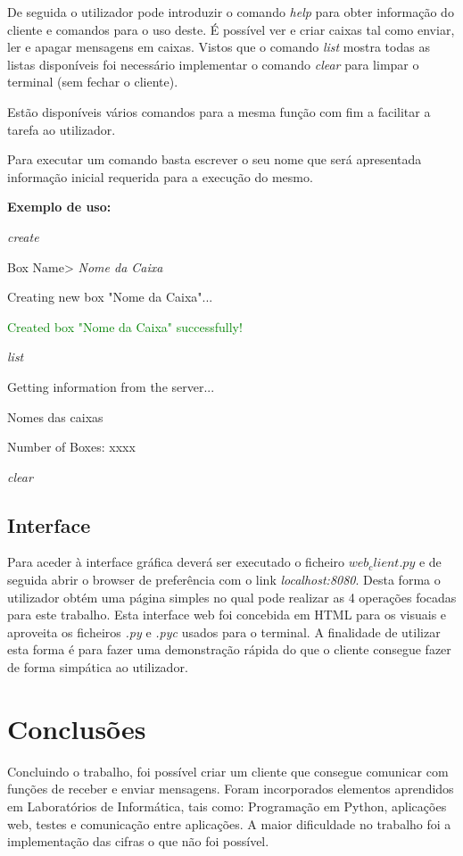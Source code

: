 \documentclass{report}
\begin{document}
De seguida o utilizador pode introduzir o comando \textit{help} para obter informação do cliente e comandos para o uso deste. É possível ver e criar caixas tal como enviar, ler e apagar mensagens em caixas. Vistos que o comando \textit{list} mostra todas as listas disponíveis foi necessário implementar o comando \textit{clear} para limpar o terminal (sem fechar o cliente).

Estão disponíveis vários comandos para a mesma função com fim a facilitar a tarefa ao utilizador.

Para executar um comando basta escrever o seu nome que será apresentada informação inicial requerida para a execução do mesmo.

\textbf{Exemplo de uso:} 


	\textit{create}	
	
	Box Name> \textit{Nome da Caixa}
	
	Creating new box "Nome da Caixa"...
	
	\textcolor{green}{Created box "Nome da Caixa" successfully!}
	
	\textit{list}	
	
	Getting information from the server...

	Nomes das caixas
	
	Number of Boxes: xxxx
	
	\textit{clear}
	

\section{Interface}
Para aceder à interface gráfica deverá ser executado o ficheiro \textit{$web_client.py$} 
e de seguida abrir o browser de preferência com o link \textit{localhost:8080}. 
Desta forma o utilizador obtém uma página simples no qual pode realizar as 4 operações focadas para este trabalho. 
Esta interface web foi concebida em HTML para os visuais e aproveita os ficheiros \textit{.py} e \textit{.pyc} usados para o terminal. 
A finalidade de utilizar esta forma é para fazer uma demonstração rápida do que o cliente consegue fazer de forma simpática ao utilizador.

\chapter{Conclusões}
\label{chap.conc}

Concluindo o trabalho, foi possível criar um cliente que consegue comunicar com funções de receber e enviar mensagens. Foram incorporados elementos aprendidos em Laboratórios de Informática, tais como: Programação em Python, aplicações web, testes e comunicação entre aplicações. A maior dificuldade no trabalho foi a implementação das cifras o que não foi possível.
\end{document}
